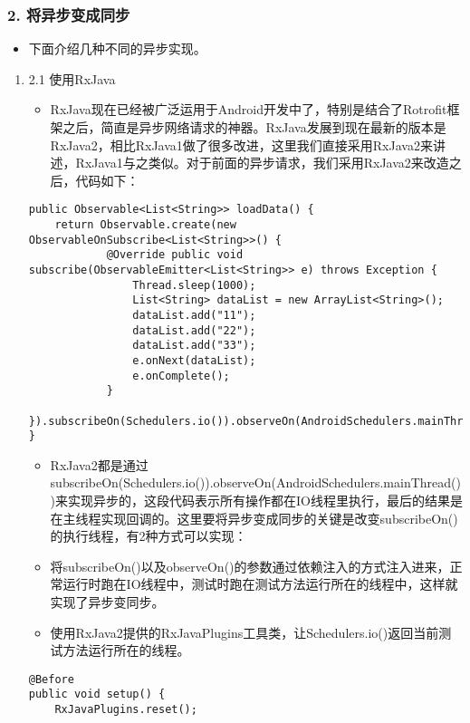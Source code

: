 \documentclass[9pt, b5paper]{article}
\begin{document}
\subsubsection{2. 将异步变成同步}
\label{sec-1-3-2}
\begin{itemize}
\item 下面介绍几种不同的异步实现。
\end{itemize}
\begin{enumerate}
\item 2.1 使用RxJava
\label{sec-1-3-2-1}
\begin{itemize}
\item RxJava现在已经被广泛运用于Android开发中了，特别是结合了Rotrofit框架之后，简直是异步网络请求的神器。RxJava发展到现在最新的版本是RxJava2，相比RxJava1做了很多改进，这里我们直接采用RxJava2来讲述，RxJava1与之类似。对于前面的异步请求，我们采用RxJava2来改造之后，代码如下：
\end{itemize}
\begin{verbatim}
public Observable<List<String>> loadData() {
    return Observable.create(new ObservableOnSubscribe<List<String>>() {
            @Override public void subscribe(ObservableEmitter<List<String>> e) throws Exception {
                Thread.sleep(1000);
                List<String> dataList = new ArrayList<String>();
                dataList.add("11");
                dataList.add("22");
                dataList.add("33");
                e.onNext(dataList);
                e.onComplete();
            }
        }).subscribeOn(Schedulers.io()).observeOn(AndroidSchedulers.mainThread());
}
\end{verbatim}
\begin{itemize}
\item RxJava2都是通过subscribeOn(Schedulers.io()).observeOn(AndroidSchedulers.mainThread())来实现异步的，这段代码表示所有操作都在IO线程里执行，最后的结果是在主线程实现回调的。这里要将异步变成同步的关键是改变subscribeOn()的执行线程，有2种方式可以实现：
\item 将subscribeOn()以及observeOn()的参数通过依赖注入的方式注入进来，正常运行时跑在IO线程中，测试时跑在测试方法运行所在的线程中，这样就实现了异步变同步。
\item 使用RxJava2提供的RxJavaPlugins工具类，让Schedulers.io()返回当前测试方法运行所在的线程。
\end{itemize}
\begin{verbatim}
@Before
public void setup() {
    RxJavaPlugins.reset();

\end{verbatim}
\end{enumerate}
\end{document}
